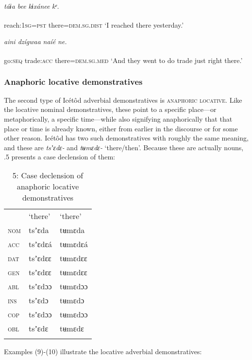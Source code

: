 \ea\label{ex:}
\textit{táɨa bee}     \textit{kɨxánee}\textit{ kᵉ.} \\
    \\
reach:\textsc{1sg}=\textsc{pst}   there=\textsc{dem.sg.dist}
\glt ‘I reached there yesterday.’ 
\z




\ea\label{ex:}
\textit{aini   dzígwaa}   \textit{naíé}\textit{ ne.} \\
    \\
go:\textsc{seq}   trade:\textsc{acc}   there=\textsc{dem.sg.med}
\glt ‘And they went to do trade just right there.’ 
\z




\subsubsection{Anaphoric locative demonstratives}

The second type of Icétôd adverbial demonstratives is \textsc{anaphoric} \textsc{locative}. Like the locative nominal demonstratives, these point to a specific place—or metaphorically, a specific time—while also signifying anaphorically that that place or time is already known, either from earlier in the discourse or for some other reason. Icétôd has two such demonstratives with roughly the same meaning, and these are \textit{tsʼɛdɛ-} and \textit{tʉmɛdɛ-} ‘there/then’. Because these are actually nouns, .5 presents a case declension of them:


\begin{table}
\caption{5: Case declension of anaphoric locative demonstratives}
\label{tab:6}


\begin{tabularx}{\textwidth}{XXX} & ‘there’ & ‘there’\\
\lsptoprule
\textsc{nom} & tsʼɛda & tʉmɛda\\
\textsc{acc} & tsʼɛdɛá & tʉmɛdɛá\\
\textsc{dat} & tsʼɛdɛɛ & tʉmɛdɛɛ\\
\textsc{gen} & tsʼɛdɛɛ & tʉmɛdɛɛ\\
\textsc{abl} & tsʼɛdɔɔ & tʉmɛdɔɔ\\
\textsc{ins} & tsʼɛdɔ & tʉmɛdɔ\\
\textsc{cop} & tsʼɛdɔɔ & tʉmɛdɔɔ\\
\textsc{obl} & tsʼɛdɛ & tʉmɛdɛ\\
\lspbottomrule
\end{tabularx}
\end{table}
Examples (9)-(10) illustrate the locative adverbial demonstratives:




